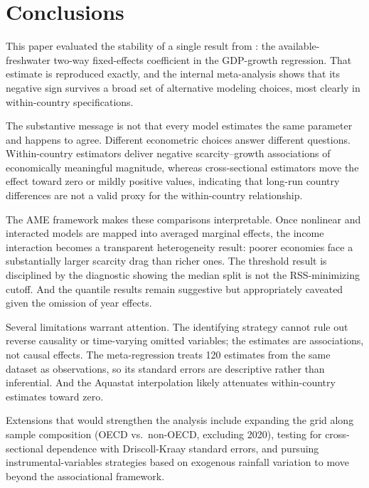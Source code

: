 \documentclass[12pt]{article}
\begin{document}


\section{Conclusions}

This paper evaluated the stability of a single result from \citet{frost_madeira_mj_2025}: the available-freshwater two-way fixed-effects coefficient in the GDP-growth regression. That estimate is reproduced exactly, and the internal meta-analysis shows that its negative sign survives a broad set of alternative modeling choices, most clearly in within-country specifications.

The substantive message is not that every model estimates the same parameter and happens to agree. Different econometric choices answer different questions. Within-country estimators deliver negative scarcity--growth associations of economically meaningful magnitude, whereas cross-sectional estimators move the effect toward zero or mildly positive values, indicating that long-run country differences are not a valid proxy for the within-country relationship.

The AME framework makes these comparisons interpretable. Once nonlinear and interacted models are mapped into averaged marginal effects, the income interaction becomes a transparent heterogeneity result: poorer economies face a substantially larger scarcity drag than richer ones. The threshold result is disciplined by the diagnostic showing the median split is not the RSS-minimizing cutoff. And the quantile results remain suggestive but appropriately caveated given the omission of year effects.

Several limitations warrant attention. The identifying strategy cannot rule out reverse causality or time-varying omitted variables; the estimates are associations, not causal effects. The meta-regression treats 120 estimates from the same dataset as observations, so its standard errors are descriptive rather than inferential. And the Aquastat interpolation likely attenuates within-country estimates toward zero.

Extensions that would strengthen the analysis include expanding the grid along sample composition (OECD vs.\ non-OECD, excluding 2020), testing for cross-sectional dependence with Driscoll-Kraay standard errors, and pursuing instrumental-variables strategies based on exogenous rainfall variation to move beyond the associational framework.
\end{document}
